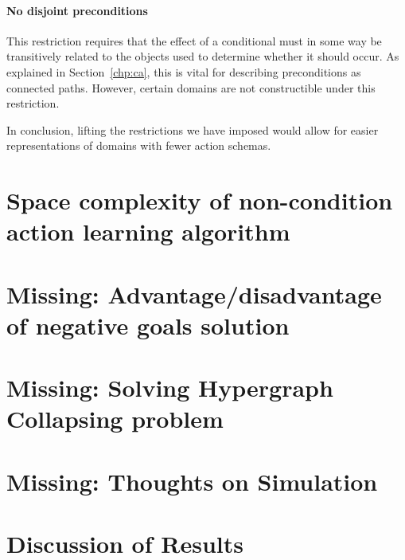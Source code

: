\documentclass[Master.tex]{subfiles}
\begin{document}
\paragraph{No disjoint preconditions}
This restriction requires that the effect of a conditional must in some way be transitively related to the objects used to determine whether it should occur. As explained in Section~\ref{chp:ca}, this is vital for describing preconditions as connected paths. However, certain domains are not constructible under this restriction. 


In conclusion, lifting the restrictions we have imposed would allow for easier representations of domains with fewer action schemas. 

\section{Space complexity of non-condition action learning algorithm}


\section{Missing: Advantage/disadvantage of negative goals solution}

\section{Missing: Solving Hypergraph Collapsing problem}

\section{Missing: Thoughts on Simulation}

\section{Discussion of Results}
   
%
%    
%
%    
\end{document}

